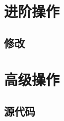 \documentclass[
    UTF8,
    heading=true,
    12pt,
    a4paper
]{ctexrep}
\begin{document}
    \part{进阶操作}
    \chapter{修改}

    \part{高级操作}
    \chapter{源代码}
\end{document}
